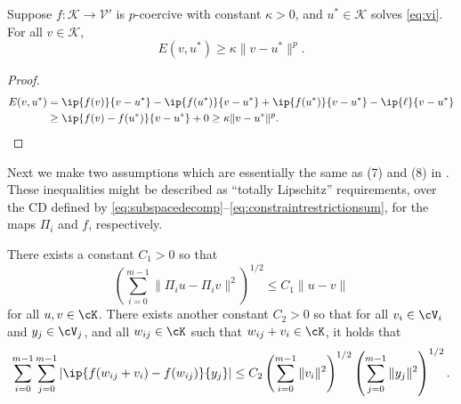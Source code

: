 \begin{lemma} \label{lem:normlike}  Suppose $f:\mathcal{K} \to \mathcal{V}'$ is $p$-coercive with constant $\kappa>0$, and $u^* \in \mathcal{K}$ solves \eqref{eq:vi}.  For  all $v \in \mathcal{K}$,
\begin{equation}
  E(v,u^*) \ge \kappa \|v-u^*\|^p.  \label{eq:normlikebound}
\end{equation}
\end{lemma}

\begin{proof}
\begin{align*}
E(v,u^*) &= \ip{f(v)}{v-u^*} - \ip{f(u^*)}{v-u^*} + \ip{f(u^*)}{v-u^*} - \ip{\ell}{v-u^*} \\
   &\ge \ip{f(v)-f(u^*)}{v-u^*} + 0 \ge \kappa \|v-u^*\|^p.  \qedhere
\end{align*}
\end{proof}

Next we make two assumptions which are essentially the same as (7) and (8) in \cite{Tai2003}.  These inequalities might be described as ``totally Lipschitz'' requirements, over the CD defined by \eqref{eq:subspacedecomp}--\eqref{eq:constraintrestrictionsum}, for the maps $\Pi_i$ and $f$, respectively.

\begin{assumptions*}  There exists a constant $C_1>0$ so that
\begin{equation}
\left(\sum_{i=0}^{m-1} \|\Pi_i u - \Pi_i v\|^2\right)^{1/2} \le C_1 \|u-v\| \label{as:lipschitzrestrictions}
\end{equation}
for all $u,v\in\cK$.  There exists another constant $C_2>0$ so that for all $v_i \in \cV_i$ and $y_j \in \cV_j$, and all $w_{ij} \in \cK$ such that $w_{ij} + v_i \in \cK$, it holds that
\begin{equation}
\sum_{i=0}^{m-1} \sum_{j=0}^{m-1} \left|\ip{f(w_{ij} + v_i) - f(w_{ij})}{y_j}\right| \le C_2 \left(\sum_{i=0}^{m-1} \|v_i\|^2\right)^{1/2} \left(\sum_{j=0}^{m-1} \|y_j\|^2\right)^{1/2}. \label{as:lipschitzresidual}
\end{equation}
\end{assumptions*}


